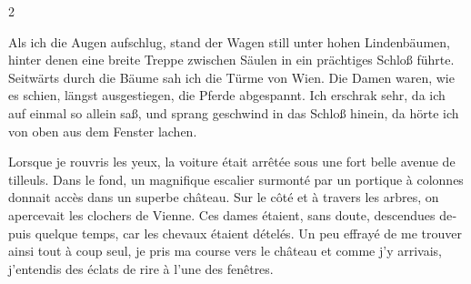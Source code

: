 \documentclass[a4paper,11pt]{article}
\newcommand\chunks[2]{%
\begin{leftcolumn*}\begin{otherlanguage}{german}%
{#1}%
\end{otherlanguage}\end{leftcolumn*}%
\begin{rightcolumn}\begin{otherlanguage}{french}%
{#2}%
\end{otherlanguage}\end{rightcolumn}%
}
\begin{document}
\begin{paracol}{2}
  \chunks{Als ich die Augen aufschlug, stand der Wagen still unter hohen Lindenbäumen, hinter denen eine breite Treppe zwischen Säulen in ein prächtiges Schloß führte. Seitwärts durch die Bäume sah ich die Türme von Wien. Die Damen waren, wie es schien, längst ausgestiegen, die Pferde abgespannt. Ich erschrak sehr, da ich auf einmal so allein saß, und sprang geschwind in das Schloß hinein, da hörte ich von oben aus dem Fenster lachen.}
         {Lorsque je rouvris les yeux, la voiture était arrêtée sous une fort belle avenue de tilleuls. Dans le fond, un magnifique escalier surmonté par un portique à colonnes donnait accès dans un superbe château. Sur le côté et à travers les arbres, on apercevait les clochers de Vienne. Ces dames étaient, sans doute, descendues depuis quelque temps, car les chevaux étaient dételés. Un peu effrayé de me trouver ainsi tout à coup seul, je pris ma course vers le château et comme j’y arrivais, j’entendis des éclats de rire à l’une des fenêtres.}

\end{paracol}
\end{document}
